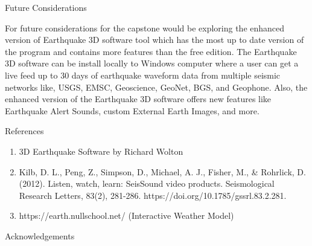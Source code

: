 \documentclass[final]{beamer}
\newlength{\onecolwid}
\begin{document}
\begin{frame}[t]
\begin{columns}[t]
\begin{column}{\onecolwid}
\begin{block}{Future Considerations}

For future considerations for the capstone would be  exploring the enhanced version of Earthquake 3D software tool which has the most up to date version of the program and contains more features than the free edition. The Earthquake 3D software can be install locally to Windows computer where a user can get a live feed up to 30 days of earthquake waveform data from multiple seismic networks like, USGS, EMSC, Geoscience, GeoNet, BGS, and Geophone. Also, the enhanced version of the Earthquake 3D software offers new features like Earthquake Alert Sounds, custom External Earth Images, and more.

\end{block}


\begin{block}{References}

\nocite{*} %


\small{
}


\begin{enumerate}
\item 3D Earthquake Software by Richard Wolton
\item Kilb, D. L., Peng, Z., Simpson, D., Michael, A. J., Fisher, M., \& Rohrlick, D. (2012). Listen, watch, learn: SeisSound video products. Seismological Research Letters, 83(2), 281-286. https://doi.org/10.1785/gssrl.83.2.281.
\item https://earth.nullschool.net/ (Interactive Weather Model)
\end{enumerate}
\end{block}



\begin{block}{Acknowledgements}

\small{} \\


\end{block}
\end{column}
\end{columns}
\end{frame}
\end{document}
